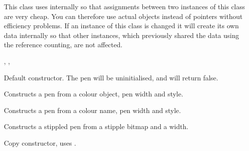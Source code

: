 This class uses 
internally so that assignments between two instances of this class are very
cheap. You can therefore use actual objects instead of pointers without
efficiency problems. If an instance of this class is changed it will create
its own data internally so that other instances, which previously shared the
data using the reference counting, are not affected.


, , 


\label{wxpenctor}


Default constructor. The pen will be uninitialised, and  will
return false.


Constructs a pen from a colour object, pen width and style.


Constructs a pen from a colour name, pen width and style.


Constructs a stippled pen from a stipple bitmap and a width.


Copy constructor, uses .







